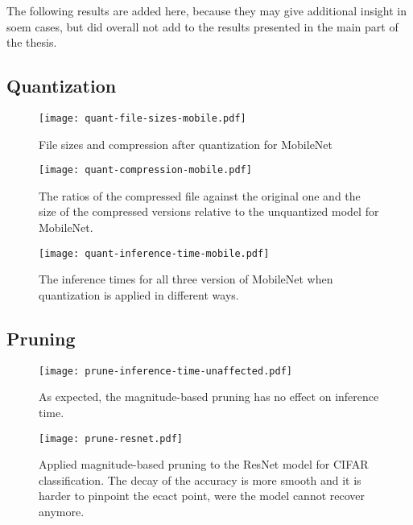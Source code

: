 
The following results are added here, because they may give additional insight in soem cases, but did overall not add to the results presented in the main part of the thesis.

\subsection*{Quantization}

\begin{figure}[!htbp]
	\texttt{[image: quant-file-sizes-mobile.pdf]}
	\centering
	\caption[File sizes and compression after quantization for MobileNet]{File sizes and compression after quantization for MobileNet}
    \label{fig:quant:size-mobile}
\end{figure}

\begin{figure}[!htbp]
	\texttt{[image: quant-compression-mobile.pdf]}
	\centering
	\caption[Compression and realive sizes after quantization for MobileNet]{The ratios of the compressed file against the original one and the size of the compressed versions relative to the unquantized model for MobileNet.}
    \label{fig:quant:ratios-mobile}
\end{figure}

\begin{figure}[!htbp]
	\texttt{[image: quant-inference-time-mobile.pdf]}
	\centering
	\caption[Inference time of the MobileNet model with quantization]{The inference times for all three version of MobileNet when quantization is applied in different ways.}
    \label{fig:quant:inference-mobile}
\end{figure}

\clearpage
\subsection*{Pruning}

\begin{figure}[!htbp]
	\texttt{[image: prune-inference-time-unaffected.pdf]}
	\centering
	\caption[Unaffected inference time after magnitude-based pruning]{As expected, the magnitude-based pruning has no effect on inference time.}
    \label{fig:prune:magnitude-inference}
\end{figure}

\begin{figure}[!htbp]
	\texttt{[image: prune-resnet.pdf]}
	\centering
	\caption[Applied magnitude-based pruning to the ResNet model for CIFAR classification]{Applied magnitude-based pruning to the ResNet model for CIFAR classification. The decay of the accuracy is more smooth and it is harder to pinpoint the ecact point, were the model cannot recover anymore.}
    \label{fig:prune:resnet}
\end{figure}

